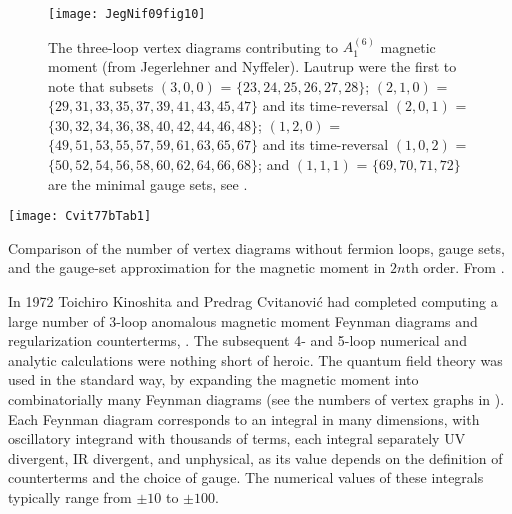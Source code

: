 \begin{figure}
\begin{center}
\texttt{[image: JegNif09fig10]}
\end{center}
\caption{\label{JegNif09fig10}
The three-loop vertex diagrams contributing to $A^{(6)}_1$
magnetic moment
(from Jegerlehner and Nyffeler).
Lautrup \etal{} were the first to note that
subsets
$(3,0,0)$ = $\{23,24,25,26,27,28\}$;
$(2,1,0)$ = $\{29,31,33,35,37,39,41,43,45,47\}$ and its time-reversal
$(2,0,1)$ = $\{30,32,34,36,38,40,42,44,46,48\}$;
$(1,2,0)$ = $\{49,51,53,55,57,59,61,63,65,67\}$ and its time-reversal
$(1,0,2)$ = $\{50,52,54,56,58,60,62,64,66,68\}$;
and
$(1,1,1)$ = $\{69,70,71,72\}$
are the minimal gauge sets, see .
}
 \end{figure}

\begin{table}
\begin{center}
\texttt{[image: Cvit77bTab1]}
\end{center}
\caption{\label{Cvit77bTab1}
Comparison of the number of vertex diagrams without fermion loops, gauge
sets, and the gauge-set approximation  for the magnetic
moment in $2n$th order.
From .
}
\end{table}

\noindent
In 1972 Toichiro Kinoshita and Predrag Cvitanovi\'c had completed
computing a large number of 3-loop anomalous magnetic moment Feynman
diagrams and regularization counterterms,
.
The subsequent 4- and 5-loop numerical and analytic calculations were
nothing short of heroic. The
quantum field theory was used in the standard way, by
expanding the magnetic moment into combinatorially many Feynman diagrams
(see the numbers of vertex graphs in ).
Each Feynman diagram corresponds to an integral in many dimensions, with
oscillatory integrand with thousands of terms, each integral separately
UV divergent, IR divergent, and unphysical, as its value depends on the
definition of counterterms and the choice of gauge.
The numerical values of these integrals typically range from  $\pm 10$
to $\pm 100$.

